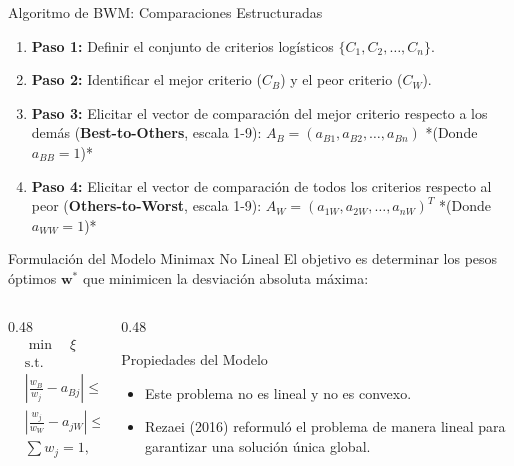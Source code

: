 \documentclass[aspectratio=169, 10pt]{beamer}
\begin{document}
\begin{frame}{Algoritmo de BWM: Comparaciones Estructuradas}
    \begin{enumerate}
        \item \textbf{Paso 1:} Definir el conjunto de criterios logísticos $\{C_1, C_2, \dots, C_n\}$.
        \item \textbf{Paso 2:} Identificar el mejor criterio ($C_B$) y el peor criterio ($C_W$).
        \item \textbf{Paso 3:} Elicitar el vector de comparación del mejor criterio respecto a los demás (\textbf{Best-to-Others}, escala 1-9):
              $A_B = (a_{B1}, a_{B2}, \dots, a_{Bn})$ *(Donde $a_{BB} = 1$)*
        \item \textbf{Paso 4:} Elicitar el vector de comparación de todos los criterios respecto al peor (\textbf{Others-to-Worst}, escala 1-9):
              $A_W = (a_{1W}, a_{2W}, \dots, a_{nW})^T$ *(Donde $a_{WW} = 1$)*
    \end{enumerate}
\end{frame}

\begin{frame}{Formulación del Modelo Minimax No Lineal}
    \small
    El objetivo es determinar los pesos óptimos $\mathbf{w}^*$ que minimicen la desviación absoluta máxima:
    \begin{columns}[T]
        \begin{column}{0.48\textwidth}
            \[
            \begin{aligned}
                & \min \quad \xi \\
                & \text{s.t.} \\
                & \left| \frac{w_B}{w_j} - a_{Bj} \right| \le \xi, \quad \forall j \\
                & \left| \frac{w_j}{w_W} - a_{jW} \right| \le \xi, \quad \forall j \\
                & \sum w_j = 1, \quad w_j \ge 0
            \end{aligned}
            \]
        \end{column}
        \begin{column}{0.48\textwidth}
            \begin{alertblock}{Propiedades del Modelo}
                \scriptsize
                \begin{itemize}
                    \item Este problema no es lineal y no es convexo.
                    \item Rezaei (2016) reformuló el problema de manera lineal para garantizar una solución única global.
                \end{itemize}
            \end{alertblock}
        \end{column}
    \end{columns}
\end{frame}
\end{document}
